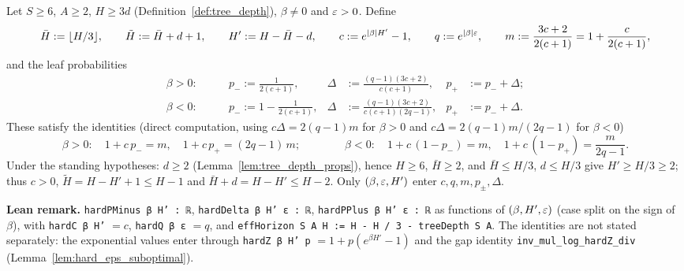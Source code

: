 \begin{definition}\label{def:hard_params}
\leanok
Let $S \ge 6$, $A \ge 2$, $H \ge 3d$ (Definition~\ref{def:tree_depth}), $\beta \ne 0$ and $\varepsilon > 0$.
Define
\[
  \bar H := \lfloor H/3 \rfloor, \qquad \tilde H := \bar H + d + 1, \qquad H' := H - \bar H - d, \qquad
  c := e^{|\beta| H'} - 1, \qquad q := e^{|\beta|\varepsilon}, \qquad m := \frac{3c + 2}{2(c+1)} = 1 + \frac{c}{2(c+1)},
\]
and the leaf probabilities
\begin{align*}
  \beta > 0:\qquad & p_- := \frac{1}{2(c+1)}, & \Delta &:= \frac{(q - 1)(3c+2)}{c(c+1)}, & p_+ &:= p_- + \Delta ; \\
  \beta < 0:\qquad & p_- := 1 - \frac{1}{2(c+1)}, & \Delta &:= \frac{(q-1)(3c+2)}{c(c+1)(2q-1)}, & p_+ &:= p_- + \Delta .
\end{align*}
These satisfy the identities (direct computation, using $c\Delta = 2(q-1)m$ for $\beta > 0$ and
$c\Delta = 2(q-1)m/(2q-1)$ for $\beta < 0$)
\[
  \beta > 0:\quad 1 + c\,p_- = m, \quad 1 + c\,p_+ = (2q - 1)\,m; \qquad\qquad
  \beta < 0:\quad 1 + c\,(1 - p_-) = m, \quad 1 + c\,(1 - p_+) = \frac{m}{2q-1} .
\]
Under the standing hypotheses: $d \ge 2$ (Lemma~\ref{lem:tree_depth_props}), hence $H \ge 6$,
$\bar H \ge 2$, and $\bar H \le H/3$, $d \le H/3$ give $H' \ge H/3 \ge 2$; thus $c > 0$,
$\tilde H = H - H' + 1 \le H - 1$ and $\bar H + d = H - H' \le H - 2$. Only $(\beta, \varepsilon, H')$ enter
$c, q, m, p_\pm, \Delta$.
\end{definition}

\textbf{Lean remark.} \texttt{hardPMinus β H' : ℝ}, \texttt{hardDelta β H' ε : ℝ},
\texttt{hardPPlus β H' ε : ℝ} as functions of $(\beta, H', \varepsilon)$ (case split on the sign of $\beta$),
with \texttt{hardC β H'} $= c$, \texttt{hardQ β ε} $= q$, and \texttt{effHorizon S A H := H - H / 3 - treeDepth S A}.
The identities are not stated separately: the exponential values enter through
\texttt{hardZ β H' p} $= 1 + p(e^{\beta H'} - 1)$ and the gap identity \texttt{inv\_mul\_log\_hardZ\_div}
(Lemma~\ref{lem:hard_eps_suboptimal}).

